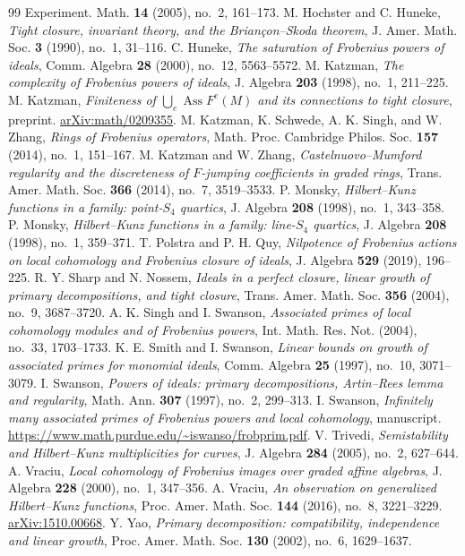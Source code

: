 \documentclass[11pt,a4paper,reqno]{amsart}
\numberwithin{equation}{section}
\theoremstyle{plain}
\theoremstyle{definition}
\theoremstyle{remark}
\DeclareMathOperator{\Ass}{Ass}
\begin{document}
\begin{thebibliography}{99}
Experiment. Math. \textbf{14} (2005), no.~2, 161--173.
M. Hochster and C. Huneke, \emph{Tight closure, invariant theory, and
the Brian\c{c}on--Skoda theorem}, J. Amer. Math. Soc. \textbf{3}
(1990), no.~1, 31--116.
C. Huneke, \emph{The saturation of Frobenius powers of ideals},
Comm. Algebra \textbf{28} (2000), no.~12, 5563--5572.
M. Katzman, \emph{The complexity of Frobenius powers of ideals},
J. Algebra \textbf{203} (1998), no.~1, 211--225.
M. Katzman, \emph{Finiteness of $\bigcup_e\Ass F^e(M)$ and its
connections to tight closure}, preprint.
\href{https://arxiv.org/abs/math/0209355}{arXiv:math/0209355}.
M. Katzman, K. Schwede, A. K. Singh, and W. Zhang, \emph{Rings of
Frobenius operators}, Math. Proc. Cambridge Philos. Soc. \textbf{157}
(2014), no.~1, 151--167.
M. Katzman and W. Zhang, \emph{Castelnuovo--Mumford regularity and the
discreteness of $F$-jumping coefficients in graded rings},
Trans. Amer. Math. Soc. \textbf{366} (2014), no.~7, 3519--3533.
P. Monsky, \emph{Hilbert--Kunz functions in a family: point-$S_4$
quartics}, J. Algebra \textbf{208} (1998), no.~1, 343--358.
P. Monsky, \emph{Hilbert--Kunz functions in a family: line-$S_4$
quartics}, J. Algebra \textbf{208} (1998), no.~1, 359--371.
T. Polstra and P. H. Quy, \emph{Nilpotence of Frobenius actions on
local cohomology and Frobenius closure of ideals},
J. Algebra \textbf{529} (2019), 196--225.
R. Y. Sharp and N. Nossem, \emph{Ideals in a perfect closure, linear
growth of primary decompositions, and tight closure},
Trans. Amer. Math. Soc. \textbf{356} (2004), no.~9, 3687--3720.
A. K. Singh and I. Swanson, \emph{Associated primes of local
cohomology modules and of Frobenius powers}, Int. Math. Res. Not.
(2004), no.~33, 1703--1733.
K. E. Smith and I. Swanson, \emph{Linear bounds on growth of associated
primes for monomial ideals}, Comm. Algebra \textbf{25} (1997), no.~10,
3071--3079.
I. Swanson, \emph{Powers of ideals: primary decompositions, Artin--Rees
lemma and regularity}, Math. Ann. \textbf{307} (1997), no.~2, 299--313.
I. Swanson, \emph{Infinitely many associated primes of Frobenius
powers and local cohomology}, manuscript.
\url{https://www.math.purdue.edu/~iswanso/frobprim.pdf}.
V. Trivedi, \emph{Semistability and Hilbert--Kunz multiplicities for
curves}, J. Algebra \textbf{284} (2005), no.~2, 627--644.
A. Vraciu, \emph{Local cohomology of Frobenius images over graded
affine algebras}, J. Algebra \textbf{228} (2000), no.~1, 347--356.
A. Vraciu, \emph{An observation on generalized Hilbert--Kunz
functions}, Proc. Amer. Math. Soc. \textbf{144} (2016), no.~8,
3221--3229. \href{https://arxiv.org/abs/1510.00668}{arXiv:1510.00668}.
Y. Yao, \emph{Primary decomposition: compatibility, independence and
linear growth}, Proc. Amer. Math. Soc. \textbf{130} (2002), no.~6,
1629--1637.
\end{thebibliography}
\end{document}
